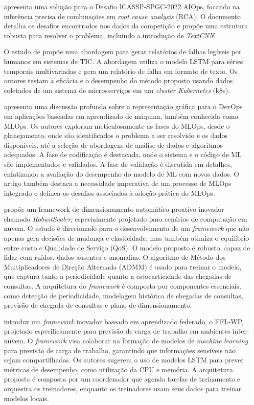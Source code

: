 \cite{9746416} apresenta uma solução para o Desafio ICASSP-SPGC-2022 AIOps, focando na inferência precisa de combinações em \textit{root cause analysis} (RCA). O documento detalha os desafios encontrados nos dados da competição e propõe uma estrutura robusta para resolver o problema, incluindo a introdução de \textit{TextCNN}.

O estudo de \cite{9789784} propõe uma abordagem para gerar relatórios de falhas legíveis por humanos em sistemas de TIC. A abordagem utiliza o modelo LSTM para séries temporais multivariadas e gera um relatório de falha em formato de texto. Os autores testam a eficácia e o desempenho do método proposto usando dados coletados de um sistema de microsserviços em um \textit{cluster Kubernetes} (k8s).


\cite{9825776} apresenta uma discussão profunda sobre a representação gráfica para o DevOps em aplicações baseadas em aprendizado de máquina, também conhecida como MLOps. Os autores exploram meticulosamente as fases do MLOps, desde o planejamento, onde são identificados o problema a ser resolvido e os dados disponíveis, até a seleção de abordagens de análise de dados e algoritmos adequados. A fase de codificação é destacada, onde o sistema e o código de ML são implementados e validados. A fase de validação é discutida em detalhes, enfatizando a avaliação do desempenho do modelo de ML com novos dados. O artigo também destaca a necessidade imperativa de um processo de MLOps integrado e delinea os desafios associados à adoção prática do MLOps.

\cite{9835411} propõe um framework de dimensionamento automático proativo inovador chamado \textit{RobustScaler}, especialmente projetado para cenários de computação em nuvem. O estudo é direcionado para o desenvolvimento de um \textit{framework} que não apenas gera decisões de mudança e elasticidade, mas também otimiza o equilíbrio entre custo e Qualidade de Serviço (QoS). O modelo proposto é robusto, capaz de lidar com ruídos, dados ausentes e anomalias. O algoritmo de Método dos Multiplicadores de Direção Alternada (ADMM) é usado para treinar o modelo, que captura tanto a periodicidade quanto a estocasticidade das chegadas de consultas. A arquitetura do \textit{framework} é composta por componentes essenciais, como detecção de periodicidade, modelagem histórica de chegadas de consultas, previsão de chegada de consultas e plano de dimensionamento.

\cite{9892264} introduz um \textit{framework} inovador baseado em aprendizado federado, o EFL-WP, projetado especificamente para previsão de carga de trabalho em ambientes inter-nuvem. O \textit{framework} visa colaborar na formação de modelos de \textit{machine learning} para previsão de carga de trabalho, garantindo que informações sensíveis não sejam compartilhadas. Os autores sugerem o uso de modelos LSTM para prever métricas de desempenho, como utilização da CPU e memória. A arquitetura proposta é composta por um coordenador que agenda tarefas de treinamento e orquestra os treinadores, enquanto os treinadores usam seus dados para treinar modelos locais.

